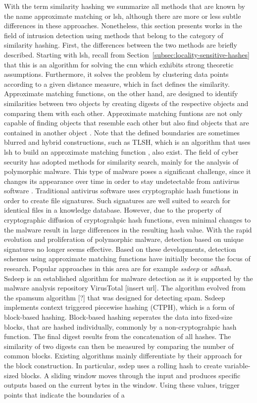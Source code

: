 \documentclass[../../main.tex]{subfiles}
\begin{document}
With the term similarity hashing we summarize all methods that are known by the name approximate matching or \gls{lsh}, although there are more or less subtle differences in these approaches. Nonetheless, this section presents works in the field of intrusion detection using methods that belong to the category of similarity hashing. First, the differences between the two methods are briefly described. Starting with \gls{lsh}, recall from Section~\ref{subsec:locality-sensitive-hashes} that this is an algorithm for solving the \gls{cnn} which exhibits strong theoretic assumptions. Furthermore, it solves the problem by clustering data points according to a given distance measure, which in fact defines the similarity. Approximate matching functions, on the other hand, are designed to identify similarities between two objects by creating digests of the respective objects and comparing them with each other. Approximate matching funtions are not only capable of finding objects that resemble each other but also find objects that are contained in another object \cite{breitinger2014approximate}. Note that the defined boundaries are sometimes blurred and hybrid constructions, such as TLSH, which is an algorithm that uses \gls{lsh} to build an approximate matching function \cite{oliver2013tlsh}, also exist. The field of cyber security has adopted methods for similarity search, mainly for the analysis of polymorphic malware. This type of malware poses a significant challenge, since it changes its appearance over time in order to stay undetectable from antivirus software \cite[p.91]{whitman_principles_2018}. Traditional antivirus software uses cryptographic hash functions in order to create file signatures. Such signatures are well suited to search for identical files in a knowledge database. However, due to the property of cryptographic diffusion of cryptograhpic hash functions, even minimal changes to the malware result in large differences in the resulting hash value. With the rapid evolution and proliferation of polymorphic malware, detection based on unique signatures no longer seems effective. Based on these developments, detection schemes using approximate matching functions have initially become the focus of research. Popular approaches in this area are for example \textit{ssdeep} or \textit{sdhash}. Ssdeep \cite{kornblum_identifying_2006} is an established algorithm for malware detection as it is supported by the malware analysis repository VirusTotal [insert url]. The algorithm evolved from the spamsum algorithm [?] that was designed for detecting spam. Ssdeep implements context triggered piecewise hashing (CTPH), which is a form of block-based hashing. Block-based hashing seperates the data into fixed-size blocks, that are hashed individually, commonly by a non-cryptograhpic hash function. The final digest results from the concatenation of all hashes. The similarity of two digests can then be measured by comparing the number of common blocks. Existing algorithms mainly differentiate by their approach for the block construction. In particular, ssdep uses a rolling hash to create variable-sized blocks. A sliding window moves through the input and produces specific outputs based on the current bytes in the window. Using these values, trigger points that indicate the boundaries of a 
\end{document}
